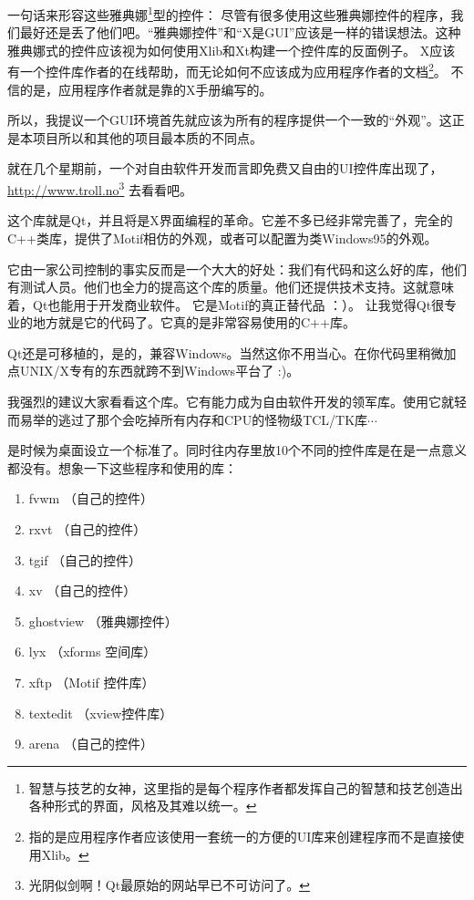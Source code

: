 \documentclass[amstex,twoside]{ctexbook}
\newenvironment{insertnote}{ \ttfamily\CJKfamily{KaiTi} }{\vskip 0.5cm }
\begin{document}
\begin{insertnote}
一句话来形容这些雅典娜\footnote{智慧与技艺的女神，这里指的是每个程序作者都发挥自己的智慧和技艺创造出各种形式的界面，风格及其难以统一。}型的控件：
尽管有很多使用这些雅典娜控件的程序，我们最好还是丢了他们吧。“雅典娜控件”和“X是GUI”应该是一样的错误想法。这种雅典娜式的控件应该视为如何使用Xlib和Xt构建一个控件库的反面例子。
X应该有一个控件库作者的在线帮助，而无论如何不应该成为应用程序作者的文档\footnote{指的是应用程序作者应该使用一套统一的方便的UI库来创建程序而不是直接使用Xlib。}。 不信的是，应用程序作者就是靠的X手册编写的。

所以，我提议一个GUI环境首先就应该为所有的程序提供一个一致的“外观”。这正是本项目所以和其他的项目最本质的不同点。

就在几个星期前，一个对自由软件开发而言即免费又自由的UI控件库出现了，\url{http://www.troll.no}\footnote{光阴似剑啊！Qt最原始的网站早已不可访问了。} 去看看吧。

这个库就是Qt，并且将是X界面编程的革命。它差不多已经非常完善了，完全的C++类库，提供了Motif相仿的外观，或者可以配置为类Windows95的外观。

它由一家公司控制的事实反而是一个大大的好处：我们有代码和这么好的库，他们有测试人员。他们也全力的提高这个库的质量。他们还提供技术支持。这就意味着，Qt也能用于开发商业软件。
它是Motif的真正替代品 ：）。  让我觉得Qt很专业的地方就是它的代码了。它真的是非常容易使用的C++库。

Qt还是可移植的，是的，兼容Windows。当然这你不用当心。在你代码里稍微加点UNIX/X专有的东西就跨不到Windows平台了 :)。


我强烈的建议大家看看这个库。它有能力成为自由软件开发的领军库。使用它就轻而易举的逃过了那个会吃掉所有内存和CPU的怪物级TCL/TK库$\cdots$

是时候为桌面设立一个标准了。同时往内存里放10个不同的控件库是在是一点意义都没有。想象一下这些程序和使用的库：

\begin{enumerate}
\item[\textbullet]    fvwm （自己的控件）
\item[\textbullet]    rxvt （自己的控件）
\item[\textbullet]    tgif （自己的控件）
\item[\textbullet]    xv （自己的控件）
\item[\textbullet]    ghostview （雅典娜控件）
\item[\textbullet]    lyx （xforms 空间库）
\item[\textbullet]    xftp （Motif 控件库）
\item[\textbullet]    textedit （xview控件库）
\item[\textbullet]    arena （自己的控件）
\end{enumerate}


\end{insertnote}
\end{document}
